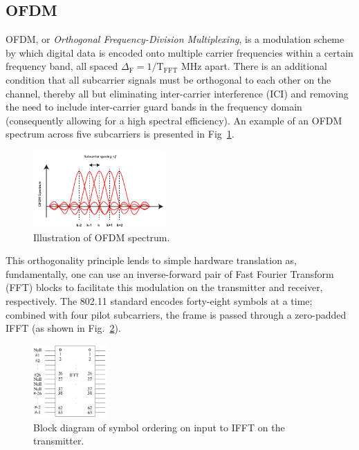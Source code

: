 \documentclass[journal]{IEEEtran}
\begin{document}
\subsection{OFDM} \label{sec:OFDM}
OFDM, or \emph{Orthogonal Frequency-Division Multiplexing}, is a modulation scheme by which digital data is encoded onto multiple carrier frequencies within a certain frequency band, all spaced $\Delta_\text{F} = 1/\text{T}_\text{FFT}$ MHz apart. There is an additional condition that all subcarrier signals must be orthogonal to each other on the channel, thereby all but eliminating inter-carrier interference (ICI) and removing the need to include inter-carrier guard bands in the frequency domain (consequently allowing for a high spectral efficiency). An example of an OFDM spectrum across five subcarriers is presented in Fig~\ref{fig:OFDM}.
\begin{figure}
    \centering
    \includegraphics[width = 0.45\textwidth]{OFDM}
    \caption{Illustration of OFDM spectrum.}
    \label{fig:OFDM}
\end{figure}

This orthogonality principle lends to simple hardware translation as, fundamentally, one can use an inverse-forward pair of Fast Fourier Transform (FFT) blocks to facilitate this modulation on the transmitter and receiver, respectively. The 802.11 standard encodes forty-eight symbols at a time; combined with four pilot subcarriers, the frame is passed through a zero-padded IFFT (as shown in Fig.~\ref{fig:IFFT}).
\begin{figure}
    \centering
    \includegraphics[width = 0.25\textwidth]{IFFT}
    \caption{Block diagram of symbol ordering on input to IFFT on the transmitter.}
    \label{fig:IFFT}
\end{figure}
\end{document}
